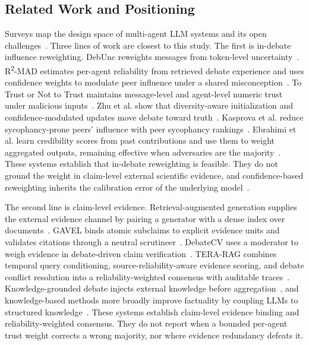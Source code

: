 \documentclass[a4paper,fleqn]{cas-sc}
\begin{document}
\subsection{Related Work and Positioning}

Surveys map the design space of multi-agent LLM systems and its open challenges~\cite{li2024survey}. Three lines of work are closest to this study. The first is in-debate influence reweighting. DebUnc reweights messages from token-level uncertainty~\cite{yoffe-etal-2025-debunc}. R\textsuperscript{2}-MAD estimates per-agent reliability from retrieved debate experience and uses confidence weights to modulate peer influence under a shared misconception~\cite{jin2026r2mad}. To Trust or Not to Trust maintains message-level and agent-level numeric trust under malicious inputs~\cite{he2026trust}. Zhu et al. show that diversity-aware initialization and confidence-modulated updates move debate toward truth~\cite{zhu2026demystifying}. Kasprova et al. reduce sycophancy-prone peers' influence with peer sycophancy rankings~\cite{kasprova2026polite}. Ebrahimi et al. learn credibility scores from past contributions and use them to weight aggregated outputs, remaining effective when adversaries are the majority~\cite{ebrahimi2025adversary}. These systems establish that in-debate reweighting is feasible. They do not ground the weight in claim-level external scientific evidence, and confidence-based reweighting inherits the calibration error of the underlying model~\cite{guo2017calibration}.

The second line is claim-level evidence. Retrieval-augmented generation supplies the external evidence channel by pairing a generator with a dense index over documents~\cite{lewis2020retrieval}. GAVEL binds atomic subclaims to explicit evidence units and validates citations through a neutral scrutineer~\cite{xu2026gavel}. DebateCV uses a moderator to weigh evidence in debate-driven claim verification~\cite{he2026debatecv}. TERA-RAG combines temporal query conditioning, source-reliability-aware evidence scoring, and debate conflict resolution into a reliability-weighted consensus with auditable traces~\cite{truong2026terarag}. Knowledge-grounded debate injects external knowledge before aggregation~\cite{wang2025learning}, and knowledge-based methods more broadly improve factuality by coupling LLMs to structured knowledge~\cite{yang2025comprehensive}. These systems establish claim-level evidence binding and reliability-weighted consensus. They do not report when a bounded per-agent trust weight corrects a wrong majority, nor where evidence redundancy defeats it.
\end{document}
